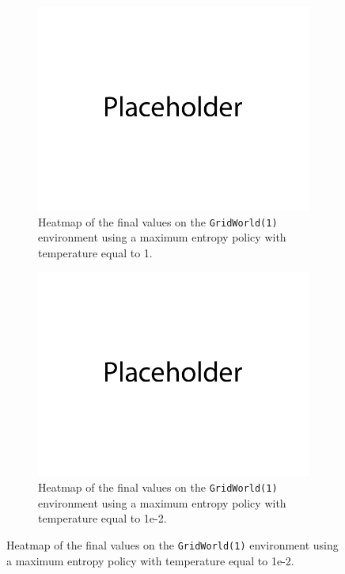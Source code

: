 \documentclass{article}
\begin{document}
\begin{enumerate}[(a)]
\begin{figure}[h!]
    \centering
    \begin{subfigure}{0.3\textwidth}
        \centering
        \includegraphics[width=\textwidth]{figures/placeholder.png}
        \caption{Heatmap of the final values on the \texttt{GridWorld(1)} environment using a maximum entropy policy with temperature equal to 1.}
    \end{subfigure}
    \hspace{0.1 in}
    \begin{subfigure}{0.3\textwidth}
        \centering
        \includegraphics[width=\textwidth]{figures/placeholder.png}
        \caption{Heatmap of the final values on the \texttt{GridWorld(1)} environment using a maximum entropy policy with temperature equal to 1e-2.}

\end{subfigure}
\end{figure}
\end{enumerate}
\end{document}
